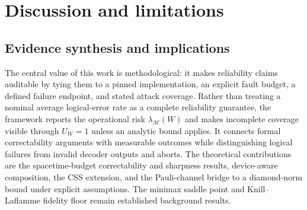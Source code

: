 \documentclass[pdflatex,sn-mathphys-num]{sn-jnl}
\theoremstyle{thmstyleone}
\theoremstyle{thmstyletwo}
\theoremstyle{thmstylethree}
\begin{document}
\section{Discussion and limitations}
\label{ssec:qmic}

\subsection{Evidence synthesis and implications}

The central value of this work is methodological: it makes reliability claims auditable by tying them to a pinned implementation, an explicit fault budget, a defined failure endpoint, and stated attack coverage. Rather than treating a nominal average logical-error rate as a complete reliability guarantee, the framework reports the operational risk $\lambda_{\mathcal{M}}(W)$ and makes incomplete coverage visible through $U_W=1$ unless an analytic bound applies. It connects formal correctability arguments with measurable outcomes while distinguishing logical failures from invalid decoder outputs and aborts. The theoretical contributions are the spacetime-budget correctability and sharpness results, device-aware composition, the CSS extension, and the Pauli-channel bridge to a diamond-norm bound under explicit assumptions. The minimax saddle point and Knill--Laflamme fidelity floor remain established background results.
\end{document}
